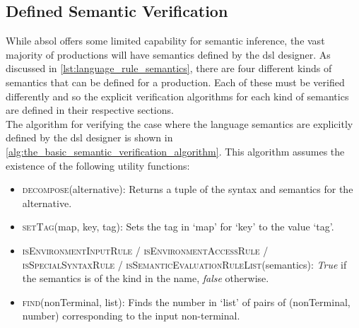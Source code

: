 
\subsection{Defined Semantic Verification} %
\label{sub:defined_semantic_verification}
While \gls{absol} offers some limited capability for semantic inference, the vast majority of productions will have semantics defined by the \gls{dsl} designer. 
As discussed in \autoref{lst:language_rule_semantics}, there are four different kinds of semantics that can be defined for a production.
Each of these must be verified differently and so the explicit verification algorithms for each kind of semantics are defined in their respective sections.\\

The algorithm for verifying the case where the language semantics are explicitly defined by the \gls{dsl} designer is shown in \autoref{alg:the_basic_semantic_verification_algorithm}.
This algorithm assumes the existence of the following utility functions:
\begin{itemize}
    \item \textsc{decompose}(alternative): Returns a tuple of the syntax and semantics for the alternative.
    \item \textsc{setTag}(map, key, tag): Sets the tag in `map' for `key' to the value `tag'. 
    \item \textsc{isEnvironmentInputRule} / \textsc{isEnvironmentAccessRule} / \textsc{isSpecialSyntaxRule} / \textsc{isSemanticEvaluationRuleList}(semantics): \textit{True} if the semantics is of the kind in the name, \textit{false} otherwise.
    \item \textsc{find}(nonTerminal, list): Finds the number in `list' of pairs of (nonTerminal, number) corresponding to the input non-terminal.
\end{itemize}

